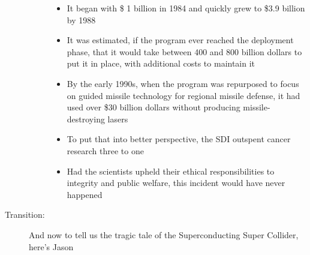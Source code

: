 \documentclass[12pt]{article}
\begin{document}
\begin{description}
\begin{description}
\begin{itemize}
          \item It began with \$ 1 billion in 1984 and quickly grew to \$3.9
            billion by 1988

          \item It was estimated, if the program ever reached the deployment
            phase, that it would take between 400 and 800 billion dollars to
            put it in place, with additional costs to maintain it
            
          \item By the early 1990s, when the program was repurposed to focus on
            guided missile technology for regional missile defense, it had used
            over \$30 billion dollars without producing missile-destroying lasers

          \item To put that into better perspective, the SDI outspent cancer
            research three to one

          \item Had the scientists upheld their ethical responsibilities to
            integrity and public welfare, this incident would have never
            happened

        \end{itemize}
        

    \end{description}

  \item[Transition:] And now to tell us the tragic tale of the Superconducting
    Super Collider, here's Jason

\end{description}
\end{document}

